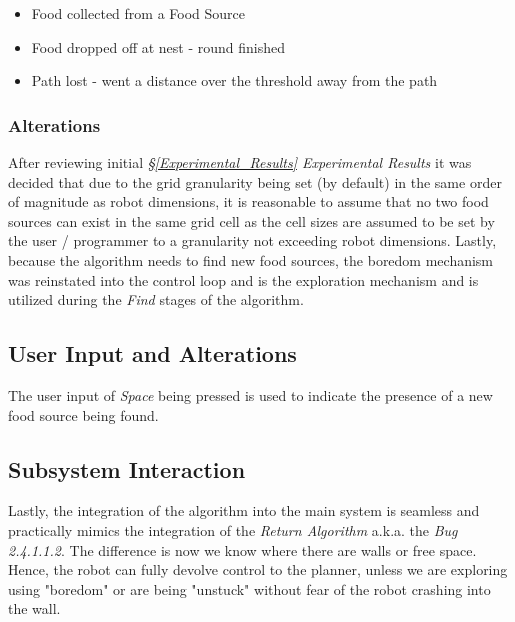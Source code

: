 \documentclass[11pt, a4paper]{article}
\begin{document}
\begin{itemize}

	\item Food collected from a Food Source
	\item Food dropped off at nest - round finished
	\item Path lost - went a distance over the threshold away from the path

\end{itemize}

\subsubsection{Alterations}
\label{Planner_Algorithm_Alterations}

After reviewing initial \textit{\S\ref{Experimental_Results} Experimental Results} it was decided 
that due to the grid granularity being set (by default) in the same order of magnitude as robot 
dimensions, it is reasonable to assume that no two food sources can exist in the same grid cell 
as the cell sizes are assumed to be set by the user / programmer to a granularity not exceeding 
robot dimensions. Lastly, because the algorithm needs to find new food sources, the boredom 
mechanism \cite{task1_report} was reinstated into the control loop and is the exploration 
mechanism and is utilized during the \textit{Find} stages of the algorithm.




\subsection{User Input and Alterations}
\label{Planner_User_Input}

The user input of \textit{Space} being pressed is used to indicate the presence of a new food 
source being found. 

\subsection{Subsystem Interaction}

Lastly, the integration of the algorithm into the main system is seamless and practically mimics 
the integration of the \textit{Return Algorithm} \cite{task2_report} a.k.a. the \textit{Bug 2.4.1.1.2}. 
The difference is now we know where there are walls or free space. Hence, the robot can fully 
devolve control to the planner, unless we are exploring using "boredom" \cite{task2_report} or 
are being "unstuck" \cite{task2_report} without fear of the robot crashing into the wall. 
\end{document}

